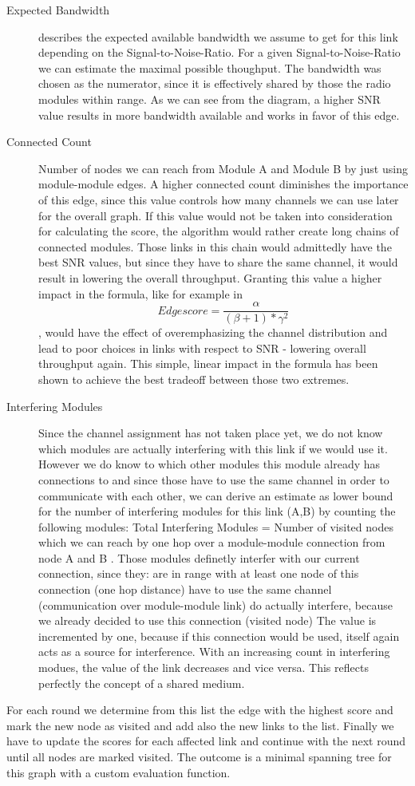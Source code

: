   \begin{description}
    \item[Expected Bandwidth]
    describes the expected available bandwidth we assume to get for this link depending on the Signal-to-Noise-Ratio.
    For a given Signal-to-Noise-Ratio we can estimate the maximal possible thoughput.
    The bandwidth was chosen as the numerator, since it is effectively shared by those the radio modules within range.
    As we can see from the diagram, a higher SNR value results in more bandwidth available and works in favor of this edge.
    \item[Connected Count]
    Number of nodes we can reach from Module A and Module B by just using module-module edges. 
    A higher connected count diminishes the importance of this edge, since this value controls how many channels we can use later for the overall graph.
    If this value would not be taken into consideration for calculating the score, the algorithm would rather create long chains of connected modules. 
    Those links in this chain would admittedly have the best SNR values, but since they have to share the same channel, it would result in lowering the overall throughput.
    Granting this value a higher impact in the formula, like for example in $$Edgescore=\frac{\alpha}{(\beta + 1 )* \gamma^2}$$, would have the effect of overemphasizing 
    the channel distribution and lead to poor choices in links with respect to SNR - lowering overall throughput again.
    This simple, linear impact in the formula has been shown to achieve the best tradeoff between those two extremes.
    \item[Interfering Modules]
    Since the channel assignment has not taken place yet, we do not know which modules are actually interfering with this link if we would use it.
    However we do know to which other modules this module already has connections to and since those have to use the same channel in order to communicate with each
    other, we can derive an estimate as lower bound for the number of interfering modules for this link (A,B) by counting the following modules:
    Total Interfering Modules = Number of visited nodes which we can reach by one hop over a module-module connection from node A and B
    . Those modules definetly interfer with our current connection, since they:
      are in range with at least one node of this connection (one hop distance)
      have to use the same channel (communication over module-module link)
      do actually interfere, because we already decided to use this connection (visited node)
    The value is incremented by one, because if this connection would be used, itself again acts as a source for interference.
    With an increasing count in interfering modues, the value of the link decreases and vice versa. This reflects perfectly the concept of a shared medium.
  \end{description}
  For each round we determine from this list the edge with the highest score and mark the new node as visited and add also the new links to the list.
  Finally we have to update the scores for each affected link and continue with the next round until all nodes are marked visited.
  The outcome is a minimal spanning tree for this graph with a custom evaluation function.

